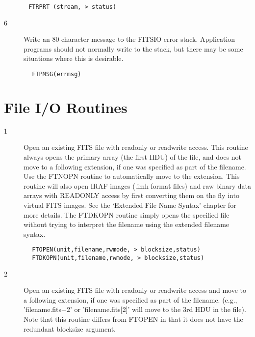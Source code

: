 \documentclass[11pt]{book}
\begin{document}
\begin{verbatim}
       FTRPRT (stream, > status)
\end{verbatim}

\begin{description}
\item[6 ] Write an 80-character message to the FITSIO error stack.  Application
    programs should not normally write to the stack, but there may be
   some situations where this is desirable.
\end{description}

\begin{verbatim}
        FTPMSG(errmsg)
\end{verbatim}


\section{File I/O Routines}


\begin{description}
\item[1 ]Open an existing FITS file with readonly or readwrite access.
   This routine always opens the primary array (the first HDU) of
   the file, and does not move to a following extension, if one was
   specified as part of the filename.   Use the FTNOPN routine to
   automatically move to the extension.  This routine will also
   open IRAF images (.imh format files) and raw binary data arrays
   with READONLY access by first converting them on the fly into
   virtual FITS images.  See the `Extended File Name Syntax' chapter
   for more details.  The FTDKOPN routine simply opens the specified
   file without trying to interpret the filename using the extended
  filename syntax.
\end{description}

\begin{verbatim}
        FTOPEN(unit,filename,rwmode, > blocksize,status)
        FTDKOPN(unit,filename,rwmode, > blocksize,status)
\end{verbatim}

\begin{description}
\item[2 ]Open an existing FITS file with readonly or readwrite access
   and move to a following extension, if one was specified as
   part of the filename.  (e.g.,  'filename.fits+2' or
   'filename.fits[2]' will move to the 3rd HDU in the file).
   Note that this routine differs from FTOPEN in that it does not
  have the redundant blocksize argument.
\end{description}
\end{document}
